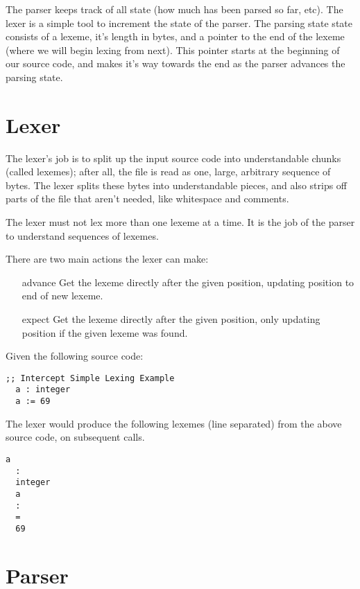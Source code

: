 \documentclass[12pt]{report}
\begin{document}
The parser keeps track of all state (how much has been parsed so far, etc). The lexer is a simple tool to increment the state of the parser. The parsing state state consists of a lexeme, it's length in bytes, and a pointer to the end of the lexeme (where we will begin lexing from next). This pointer starts at the beginning of our source code, and makes it's way towards the end as the parser advances the parsing state.

\section{Lexer}
\label{subsec:lexer}

The lexer's job is to split up the input source code into understandable chunks (called lexemes); after all, the file is read as one, large, arbitrary sequence of bytes. The lexer splits these bytes into understandable pieces, and also strips off parts of the file that aren't needed, like whitespace and comments.

The lexer must not lex more than one lexeme at a time. It is the job of the parser to understand sequences of lexemes.

\vspace{1em}

There are two main actions the lexer can make:
\begin{itemize}
\item[advance] Get the lexeme directly after the given position, updating position to end of new lexeme.
\item[expect]  Get the lexeme directly after the given position, only updating position if the given lexeme was found.
\end{itemize}

\begin{minipage}{\textwidth}

Given the following source code:
\begin{Verbatim}[samepage=true]
  ;; Intercept Simple Lexing Example
  a : integer
  a := 69
\end{Verbatim}

The lexer would produce the following lexemes (line separated) from the above source code, on subsequent calls.
\begin{Verbatim}[samepage=true]
  a
  :
  integer
  a
  :
  =
  69
\end{Verbatim}
\end{minipage}

\section{Parser}
\label{subsec:parser}
\end{document}
